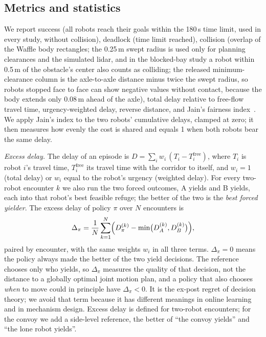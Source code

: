 \documentclass[letterpaper,journal]{IEEEtran}
\begin{document}
\subsection{Metrics and statistics}
We report success (all robots reach their goals within the 180\,s time limit, used in every study, without collision), deadlock (time limit reached), collision (overlap of the Waffle body rectangles; the 0.25\,m swept radius is used only for planning clearances and the simulated lidar, and in the blocked-bay study a robot within 0.5\,m of the obstacle's center also counts as colliding; the released minimum-clearance column is the axle-to-axle distance minus twice the swept radius, so robots stopped face to face can show negative values without contact, because the body extends only 0.08\,m ahead of the axle), total delay relative to free-flow travel time, urgency-weighted delay, reverse distance, and Jain's fairness index~\cite{jain1984fairness}. We apply Jain's index to the two robots' cumulative delays, clamped at zero; it then measures how evenly the cost is shared and equals 1 when both robots bear the same delay.

\emph{Excess delay.} The delay of an episode is $D=\sum_i w_i\,(T_i-T_i^{\mathrm{free}})$, where $T_i$ is robot $i$'s travel time, $T_i^{\mathrm{free}}$ its travel time with the corridor to itself, and $w_i=1$ (total delay) or $w_i$ equal to the robot's urgency (weighted delay). For every two-robot encounter $k$ we also run the two forced outcomes, A yields and B yields, each into that robot's best feasible refuge; the better of the two is the \emph{best forced yielder}. The excess delay of policy $\pi$ over $N$ encounters is
\begin{equation}
\Delta_\pi=\frac{1}{N}\sum_{k=1}^{N}\Bigl(D_\pi^{(k)}-\min\bigl(D_{A}^{(k)},D_{B}^{(k)}\bigr)\Bigr),
\label{eq:excess}
\end{equation}
paired by encounter, with the same weights $w_i$ in all three terms. $\Delta_\pi=0$ means the policy always made the better of the two yield decisions. The reference chooses only who yields, so $\Delta_\pi$ measures the quality of that decision, not the distance to a globally optimal joint motion plan, and a policy that also chooses \emph{when} to move could in principle have $\Delta_\pi<0$. It is the ex-post regret of decision theory; we avoid that term because it has different meanings in online learning and in mechanism design. Excess delay is defined for two-robot encounters; for the convoy we add a side-level reference, the better of ``the convoy yields'' and ``the lone robot yields''.
\end{document}
